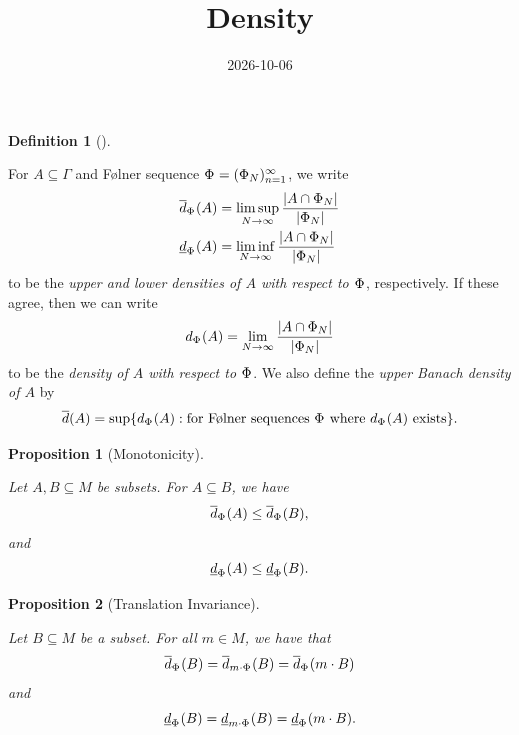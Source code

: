 \documentclass[
  british,
]{article}
\title{Density}
\author{}
\date{2026-10-06}
\theoremstyle{definition}
\newtheorem{definition}{Definition}[section]
\theoremstyle{plain}
\newtheorem{proposition}{Proposition}[section]
\theoremstyle{plain}
\theoremstyle{remark}
\newcommand{\CountingMeasure}[1]{{\left|#1\right|}}
\newcommand{\Folner}[1][\vphantom{}]{{\Phi}_{#1}}
\newcommand{\Group}{{\Gamma}}
\newcommand{\Monoid}{{M}}
\newcommand{\MonoidElement}{{m}}
\newcommand{\MonoidOperation}[2]{{#1}\cdot{#2}}
\newcommand{\UpperBanachDensity}[1]{\overline{d}({#1})}
\newcommand{\Density}[2][\Folner]{d_{{#1}}({#2})}
\newcommand{\LowerDensity}[2][\Folner]{\underline{d}_{{#1}}({#2})}
\newcommand{\UpperDensity}[2][\Folner]{\overline{d}_{{#1}}({#2})}
\begin{document}
\maketitle


\begin{definition}[]\protect\hypertarget{def-density}{}\label{def-density}

For \(A\subseteq\Group\) and Følner sequence
\(\Folner=(\Folner[N])_{n=1}^\infty\), we write \begin{align*}
    \UpperDensity{A}&=\limsup_{N\rightarrow\infty}\frac{\CountingMeasure{A\cap\Folner[N]}}{\CountingMeasure{\Folner[N]}}
    \\\LowerDensity{A}&=\liminf_{N\rightarrow\infty}\frac{\CountingMeasure{A\cap\Folner[N]}}{\CountingMeasure{\Folner[N]}}
\end{align*} to be the \emph{upper and lower densities of \(A\) with
respect to \(\Folner\)}, respectively. If these agree, then we can write
\[
\Density{A}=\lim_{N\rightarrow\infty}\frac{\CountingMeasure{A\cap\Folner[N]}}{\CountingMeasure{\Folner[N]}}
\] to be the \emph{density of \(A\) with respect to \(\Folner\)}. We
also define the \emph{upper Banach density of \(A\)} by \[
\UpperBanachDensity{A}=\sup\{d_{\Folner}(A):\text{for Følner sequences }\Folner\text{ where }d_{\Folner}(A)\text{ exists}\}.
\]

\end{definition}

\begin{proposition}[Monotonicity]\protect\hypertarget{prp-DensityMonotonicity}{}\label{prp-DensityMonotonicity}

Let \(A,B\subseteq\Monoid\) be subsets. For \(A\subseteq B\), we
have\[\UpperDensity{A}\leq\UpperDensity{B}, \]and\[\LowerDensity{A}\leq\LowerDensity{B}. \]

\end{proposition}

\begin{proposition}[Translation
Invariance]\protect\hypertarget{prp-DensityTranslationInvariance}{}\label{prp-DensityTranslationInvariance}

Let \(B\subseteq\Monoid\) be a subset. For all
\(\MonoidElement\in\Monoid\), we have that
\[\UpperDensity{B}=\UpperDensity[\MonoidOperation{\MonoidElement}{\Folner}]{B}=\UpperDensity{\MonoidOperation{\MonoidElement}{B}}\]
and
\[\LowerDensity{B}=\LowerDensity[\MonoidOperation{\MonoidElement}{\Folner}]{B}=\LowerDensity{\MonoidOperation{\MonoidElement}{B}}.\]

\end{proposition}
\end{document}
